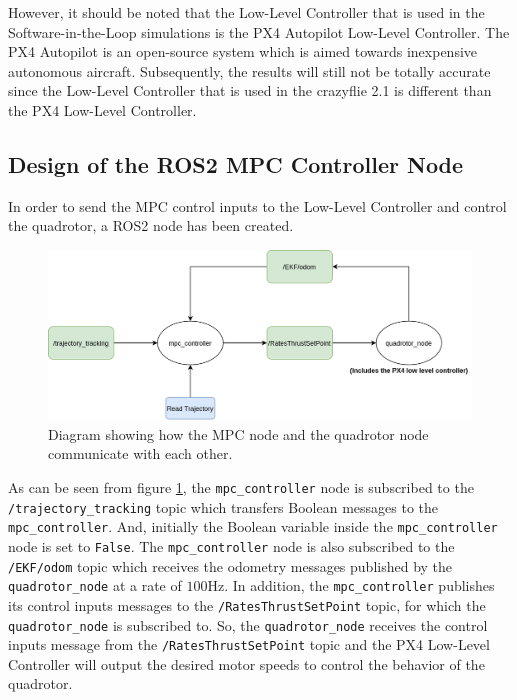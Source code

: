 \documentclass{thesisreport}
\begin{document}
However, it should be noted that the Low-Level Controller that is used in the Software-in-the-Loop simulations is the PX4 Autopilot Low-Level Controller. The PX4 Autopilot \cite{px4_autopilot_2021} is an open-source system which is aimed towards inexpensive autonomous aircraft. Subsequently, the results will still not be totally accurate since the Low-Level Controller that is used in the crazyflie 2.1 is different than the PX4 Low-Level Controller.

\subsection{Design of the ROS2 MPC Controller Node}
 
 In order to send the MPC control inputs to the Low-Level Controller and control the quadrotor, a ROS2 node has been created.
 
 \begin{figure}[h]
 	\centering
 	\includegraphics[width=\textwidth]{Images/sil_simulations/ros2_node_diagram.png}
 	\caption{Diagram showing how the MPC node and the quadrotor node communicate with each other.}
 	\label{fig:ROS2_MPC_node}
 \end{figure}

As can be seen from figure \ref{fig:ROS2_MPC_node}, the \texttt{mpc\_controller} node is subscribed to the \texttt{/trajectory\_tracking} topic which transfers Boolean messages to the \texttt{mpc\_controller}. And, initially the Boolean variable inside the \texttt{mpc\_controller} node is set to \texttt{False}. The \texttt{mpc\_controller} node is also subscribed to the \texttt{/EKF/odom} topic which receives the odometry messages published by the \texttt{quadrotor\_node} at a rate of $100$Hz. In addition, the \texttt{mpc\_controller} publishes its control inputs messages to the \texttt{/RatesThrustSetPoint} topic, for which the \texttt{quadrotor\_node} is subscribed to. So, the \texttt{quadrotor\_node} receives the control inputs message from the \texttt{/RatesThrustSetPoint} topic and the PX4 Low-Level Controller will output the desired motor speeds to control the behavior of the quadrotor. \\
\end{document}
